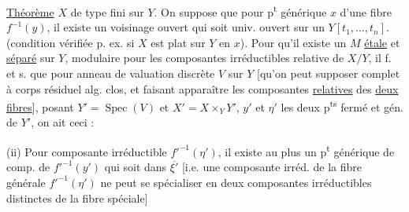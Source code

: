 \uline{Théorème} $X$  de type fini sur $Y$. On suppose que  pour  p\textsuperscript{t} générique $x$ d'une  fibre $f^{-1}(y)$, il existe un voisinage ouvert qui soit univ. ouvert  sur un $Y[t_1,\ldots,t_n]$. (condition vérifiée p. ex. si $X$ est plat sur $Y$ en   $x$). Pour qu'il existe un $M$ \uline{étale} et \uline{séparé} sur $Y$,  modulaire pour les composantes irréductibles relative de $X/Y$, il f. et s. que pour  anneau de valuation discrète $V$ sur $Y$ [qu'on peut supposer complet à corps résiduel alg. clos, et  faisant apparaître les composantes  \uline{relatives} des \uline{deux fibres}], posant $Y'=\operatorname{Spec}(V)$ et $X'=X\times_Y Y'$, $y'$ et $\eta'$ les deux p\textsuperscript{ts} fermé et gén. de $Y'$, on ait ceci :


(ii) Pour   composante irréductible   $ {f'}^{-1}(\eta')$, il existe au plus un p\textsuperscript{t} générique de comp. de $ {f'}^{-1}(y')$ qui soit dans $\overline{\xi'}$ [i.e. une composante irréd. de la fibre générale $ {f'}^{-1}(\eta')$ ne peut se spécialiser en deux composantes irréductibles distinctes de la fibre spéciale]
